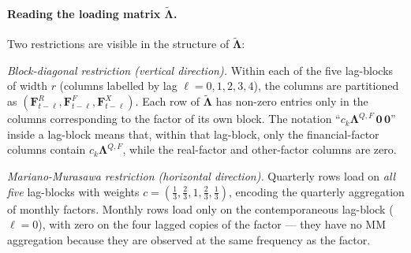 \documentclass[11pt, a4paper, oneside]{article}
\newcommand{\mL}{\boldsymbol{\Lambda}}
\begin{document}
\paragraph{Reading the loading matrix $\tilde{\mL}$.}
Two restrictions are visible in the structure of $\tilde{\mL}$:

\emph{Block-diagonal restriction (vertical direction).} Within each
of the five lag-blocks of width $r$ (columns labelled by lag $\ell = 0, 1, 2, 3, 4$),
the columns are partitioned as $(\mathbf{F}^R_{t-\ell}, \mathbf{F}^F_{t-\ell}, \mathbf{F}^X_{t-\ell})$.
Each row of $\tilde{\mL}$ has non-zero entries only in the
columns corresponding to the factor of its own block. The notation
``$c_k \mL^{Q,F}\,\mathbf{0}\,\mathbf{0}$'' inside a lag-block means
that, within that lag-block, only the financial-factor columns
contain $c_k \mL^{Q,F}$, while the real-factor and other-factor
columns are zero.

\emph{Mariano-Murasawa restriction (horizontal direction).}
Quarterly rows load on \emph{all five} lag-blocks with weights
$c = (\tfrac{1}{3}, \tfrac{2}{3}, 1, \tfrac{2}{3}, \tfrac{1}{3})$,
encoding the quarterly aggregation of monthly factors. Monthly rows
load only on the contemporaneous lag-block ($\ell = 0$), with zero
on the four lagged copies of the factor — they have no MM
aggregation because they are observed at the same frequency as the
factor.
\end{document}
